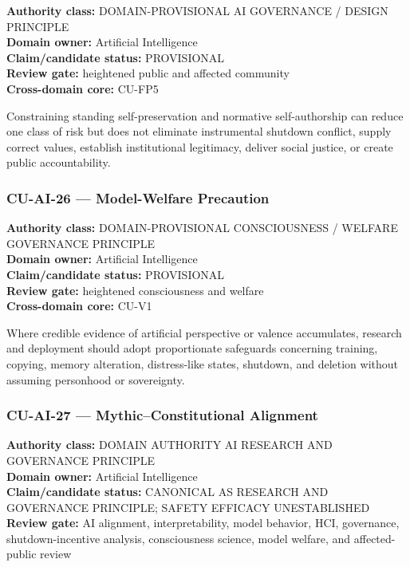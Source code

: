 \documentclass[
  11pt,
]{article}
\begin{document}
\textbf{Authority class:} DOMAIN-PROVISIONAL AI GOVERNANCE / DESIGN
PRINCIPLE\\
\textbf{Domain owner:} Artificial Intelligence\\
\textbf{Claim/candidate status:} PROVISIONAL\\
\textbf{Review gate:} heightened public and affected community\\
\textbf{Cross-domain core:} CU-FP5

Constraining standing self-preservation and normative self-authorship
can reduce one class of risk but does not eliminate instrumental
shutdown conflict, supply correct values, establish institutional
legitimacy, deliver social justice, or create public accountability.

\subsubsection{CU-AI-26 --- Model-Welfare
Precaution}\label{cu-ai-26-model-welfare-precaution}

\textbf{Authority class:} DOMAIN-PROVISIONAL CONSCIOUSNESS / WELFARE
GOVERNANCE PRINCIPLE\\
\textbf{Domain owner:} Artificial Intelligence\\
\textbf{Claim/candidate status:} PROVISIONAL\\
\textbf{Review gate:} heightened consciousness and welfare\\
\textbf{Cross-domain core:} CU-V1

Where credible evidence of artificial perspective or valence
accumulates, research and deployment should adopt proportionate
safeguards concerning training, copying, memory alteration,
distress-like states, shutdown, and deletion without assuming personhood
or sovereignty.

\subsubsection{CU-AI-27 --- Mythic--Constitutional
Alignment}\label{cu-ai-27-mythicconstitutional-alignment}

\textbf{Authority class:} DOMAIN AUTHORITY AI RESEARCH AND GOVERNANCE
PRINCIPLE\\
\textbf{Domain owner:} Artificial Intelligence\\
\textbf{Claim/candidate status:} CANONICAL AS RESEARCH AND GOVERNANCE
PRINCIPLE; SAFETY EFFICACY UNESTABLISHED\\
\textbf{Review gate:} AI alignment, interpretability, model behavior,
HCI, governance, shutdown-incentive analysis, consciousness science,
model welfare, and affected-public review
\end{document}

